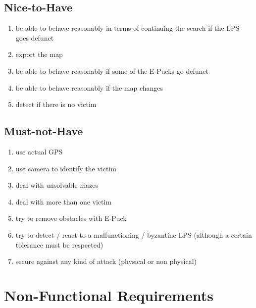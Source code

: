 \documentclass[a4paper,parskip,headheight=38pt]{scrartcl} %
\begin{document}
\subsection{Nice-to-Have}
\begin{enumerate}[label=\nicetohave,ref=\nicetohave]
\item be able to behave reasonably in terms of continuing the search if the LPS goes defunct\label{req:missLPS}
\item export the map
\item be able to behave reasonably if some of the E-Pucks go defunct \label{req:puckFault}
\item be able to behave reasonably if the map changes \label{req:mapChange}
\item detect if there is no victim
\end{enumerate}

\subsection{Must-not-Have}
\begin{enumerate}[label=\mustnothave]
\item use actual GPS
\item use camera to identify the victim
\item deal with unsolvable mazes
\item deal with more than one victim
\item try to remove obstacles with E-Puck
\item try to detect / react to a malfunctioning / byzantine LPS (although a certain tolerance must be respected)
\item secure against any kind of attack (physical or non physical)
\end{enumerate}

\section{Non-Functional Requirements}
\end{document}
